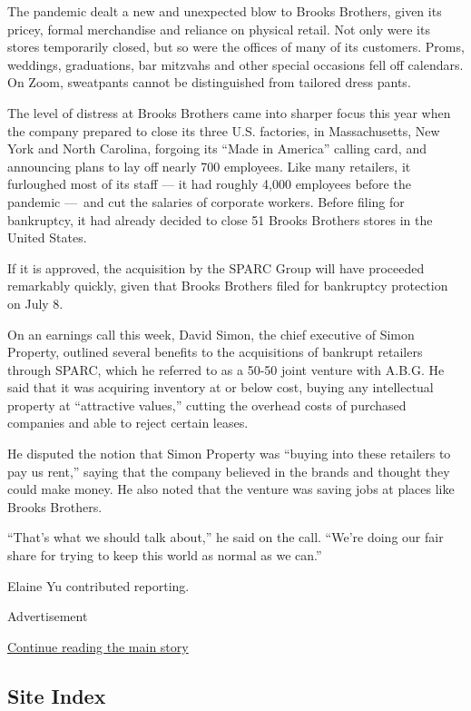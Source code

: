 The pandemic dealt a new and unexpected blow to Brooks Brothers, given
its pricey, formal merchandise and reliance on physical retail. Not only
were its stores temporarily closed, but so were the offices of many of
its customers. Proms, weddings, graduations, bar mitzvahs and other
special occasions fell off calendars. On Zoom, sweatpants cannot be
distinguished from tailored dress pants.

The level of distress at Brooks Brothers came into sharper focus this
year when the company prepared to close its three U.S. factories, in
Massachusetts, New York and North Carolina, forgoing its ``Made in
America'' calling card, and announcing plans to lay off nearly 700
employees. Like many retailers, it furloughed most of its staff --- it
had roughly 4,000 employees before the pandemic ---~and cut the salaries
of corporate workers. Before filing for bankruptcy, it had already
decided to close 51 Brooks Brothers stores in the United States.

If it is approved, the acquisition by the SPARC Group will have
proceeded remarkably quickly, given that Brooks Brothers filed for
bankruptcy protection on July 8.

On an earnings call this week, David Simon, the chief executive of Simon
Property, outlined several benefits to the acquisitions of bankrupt
retailers through SPARC, which he referred to as a 50-50 joint venture
with A.B.G. He said that it was acquiring inventory at or below cost,
buying any intellectual property at ``attractive values,'' cutting the
overhead costs of purchased companies and able to reject certain leases.

He disputed the notion that Simon Property was ``buying into these
retailers to pay us rent,'' saying that the company believed in the
brands and thought they could make money. He also noted that the venture
was saving jobs at places like Brooks Brothers.

``That's what we should talk about,'' he said on the call. ``We're doing
our fair share for trying to keep this world as normal as we can.''

Elaine Yu contributed reporting.

Advertisement

\protect\hyperlink{after-bottom}{Continue reading the main story}

\hypertarget{site-index}{%
\subsection{Site Index}\label{site-index}}

